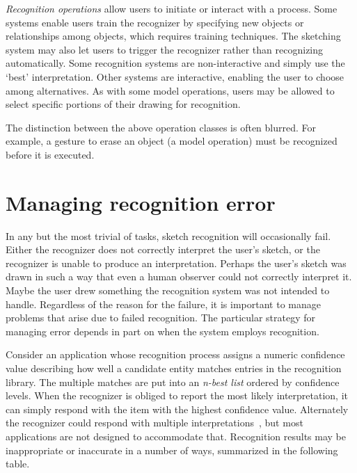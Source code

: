 \textit{Recognition operations} allow users to initiate or interact
with a process. Some systems enable users train the recognizer by
specifying new objects or relationships among objects, which requires
training techniques. The sketching system may also let users to
trigger the recognizer rather than recognizing automatically. Some
recognition systems are non-interactive and simply use the `best'
interpretation. Other systems are interactive, enabling the user to
choose among alternatives. As with some model operations, users may be
allowed to select specific portions of their drawing for recognition.

The distinction between the above operation classes is often
blurred. For example, a gesture to erase an object (a model operation)
must be recognized before it is executed.

\section{Managing recognition error}
\label{sec:recognition-difficulties}

In any but the most trivial of tasks, sketch recognition will
occasionally fail. Either the recognizer does not correctly interpret
the user's sketch, or the recognizer is unable to produce an
interpretation. Perhaps the user's sketch was drawn in such a way that
even a human observer could not correctly interpret it. Maybe the user
drew something the recognition system was not intended to
handle. Regardless of the reason for the failure, it is important to
manage problems that arise due to failed recognition. The particular
strategy for managing error depends in part on when the system employs
recognition.

Consider an application whose recognition process assigns a numeric
confidence value describing how well a candidate entity matches
entries in the recognition library. The multiple matches are put into
an \textit{n-best list} ordered by confidence levels. When the
recognizer is obliged to report the most likely interpretation, it can
simply respond with the item with the highest confidence
value. Alternately the recognizer could respond with multiple
interpretations~\cite{gross-boe,alvarado-sketchread-uist}, but most
applications are not designed to accommodate that. Recognition results
may be inappropriate or inaccurate in a number of ways, summarized in
the following table.

